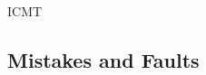 \begin{copiedFrom}{ICMT}




\subsection{Mistakes and Faults}
\label{chap:errors:mistakes}


\end{copiedFrom}
